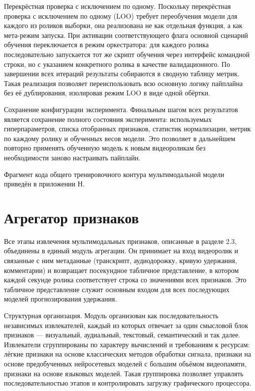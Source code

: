 \documentclass[times]{itmo-student-thesis}
\begin{document}
Перекрёстная проверка с исключением по одному. Поскольку перекрёстная проверка с исключением по одному (LOO) требует переобучения модели для каждого из роликов выборки, она реализована не как отдельная функция, а как мета-режим запуска. При активации соответствующего флага основной сценарий обучения переключается в режим оркестратора: для каждого ролика последовательно запускается тот же скрипт обучения через интерфейс командной строки, но с указанием конкретного ролика в качестве валидационного. По завершении всех итераций результаты собираются в сводную таблицу метрик. Такая реализация позволяет переиспользовать всю основную логику пайплайна без её дублирования, изолировав режим LOO в виде одной обёртки.

Сохранение конфигурации эксперимента. Финальным шагом всех результатов является сохранение полного состояния эксперимента: используемых гиперпараметров, списка отобранных признаков, статистик нормализации, метрик по каждому ролику и обученных весов модели. Это позволяет в дальнейшем повторно применять обученную модель к новым видеороликам без необходимости заново настраивать пайплайн.

Фрагмент кода общего тренировочного контура мультимодальной модели приведён в приложении Н.

\section{Агрегатор признаков}

Все этапы извлечения мультимодальных признаков, описанные в разделе 2.3, объединены в единый модуль агрегации. Он принимает на вход видеоролик и связанные с ним метаданные (транскрипт, аудиодорожку, кривую удержания, комментарии) и возвращает посекундное табличное представление, в котором каждой секунде ролика соответствует строка со значениями всех признаков. Это табличное представление служит основным входом для всех последующих моделей прогнозирования удержания.

Структурная организация. Модуль организован как последовательность независимых извлекателей, каждый из которых отвечает за один смысловой блок признаков — визуальный, аудиальный, текстовый, семантический и так далее. Извлекатели сгруппированы по характеру вычислений и требованиям к ресурсам: лёгкие признаки на основе классических методов обработки сигнала, признаки на основе предобученных нейросетевых моделей с большим объёмом видеопамяти, признаки на основе языковых моделей. Такая группировка позволяет управлять последовательностью этапов и контролировать загрузку графического процессора.
\end{document}
